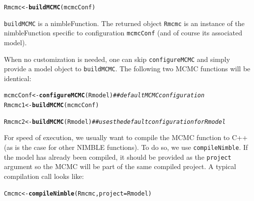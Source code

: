 \documentclass[12pt,oneside]{book}\usepackage[]{graphicx}\usepackage[]{color}
\makeatletter
\newcommand{\hlcom}[1]{\textcolor[rgb]{0.678,0.584,0.686}{\textit{#1}}}%
\newcommand{\hlstd}[1]{\textcolor[rgb]{0.345,0.345,0.345}{#1}}%
\newcommand{\hlkwb}[1]{\textcolor[rgb]{0.69,0.353,0.396}{#1}}%
\newcommand{\hlkwc}[1]{\textcolor[rgb]{0.333,0.667,0.333}{#1}}%
\newcommand{\hlkwd}[1]{\textcolor[rgb]{0.737,0.353,0.396}{\textbf{#1}}}%
\newenvironment{kframe}{%
 \def\at@end@of@kframe{}%
 \ifinner\ifhmode%
  \def\at@end@of@kframe{\end{minipage}}%
  \begin{minipage}{\columnwidth}%
 \fi\fi%
 \def\FrameCommand##1{\hskip\@totalleftmargin \hskip-\fboxsep
 \colorbox{shadecolor}{##1}\hskip-\fboxsep
     \hskip-\linewidth \hskip-\@totalleftmargin \hskip\columnwidth}%
 \MakeFramed {\advance\hsize-\width
   \@totalleftmargin\z@ \linewidth\hsize
   \@setminipage}}%
 {\par\unskip\endMakeFramed%
 \at@end@of@kframe}
\newenvironment{knitrout}{}{} %
\def\cd#1{\texttt{#1}}
\makeatother
\begin{document}
\begin{knitrout}
\color{fgcolor}\begin{kframe}
\begin{alltt}
\hlstd{Rmcmc} \hlkwb{<-} \hlkwd{buildMCMC}\hlstd{(mcmcConf)}
\end{alltt}
\end{kframe}
\end{knitrout}

\cd{buildMCMC} is a nimbleFunction.  The returned object \cd{Rmcmc} is an instance  of the nimbleFunction specific to configuration \cd{mcmcConf} (and of course its associated model).

When no customization is needed, one can skip \cd{configureMCMC} and simply provide a model object to \cd{buildMCMC}. The following two MCMC functions will be identical:

\begin{knitrout}
\color{fgcolor}\begin{kframe}
\begin{alltt}
\hlstd{mcmcConf} \hlkwb{<-} \hlkwd{configureMCMC}\hlstd{(Rmodel)}   \hlcom{## default MCMC configuration}
\hlstd{Rmcmc1} \hlkwb{<-} \hlkwd{buildMCMC}\hlstd{(mcmcConf)}

\hlstd{Rmcmc2} \hlkwb{<-} \hlkwd{buildMCMC}\hlstd{(Rmodel)}   \hlcom{## uses the default configuration for Rmodel}
\end{alltt}
\end{kframe}
\end{knitrout}

For speed of execution, we usually want to compile the MCMC function to C++ (as is the case for other NIMBLE functions).  To do so, we use \cd{compileNimble}.  If the model has already been compiled, it should be provided as the \cd{project} argument so the MCMC will be part of the same compiled project.  A typical compilation call looks like:

\begin{knitrout}
\color{fgcolor}\begin{kframe}
\begin{alltt}
\hlstd{Cmcmc} \hlkwb{<-} \hlkwd{compileNimble}\hlstd{(Rmcmc,} \hlkwc{project} \hlstd{= Rmodel)}
\end{alltt}
\end{kframe}
\end{knitrout}
\end{document}
